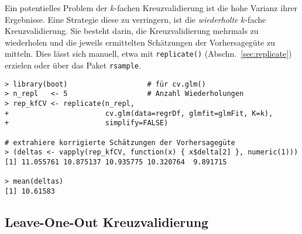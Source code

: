 Ein potentielles Problem der $k$-fachen Kreuzvalidierung ist die hohe Varianz ihrer Ergebnisse. Eine Strategie diese zu verringern, ist die \emph{wiederholte} $k$-fache Kreuzvalidierung. Sie besteht darin, die Kreuzvalidierung mehrmals zu wiederholen und die jeweils ermittelten Schätzungen der Vorhersagegüte zu mitteln. Dies lässt sich manuell, etwa mit \lstinline!replicate()! (Abschn.\ \ref{sec:replicate}) erzielen oder über das Paket  \lstinline!rsample!.
\begin{lstlisting}
> library(boot)                   # für cv.glm()
> n_repl   <- 5                   # Anzahl Wiederholungen
> rep_kfCV <- replicate(n_repl,
+                       cv.glm(data=regrDf, glmfit=glmFit, K=k),
+                       simplify=FALSE)

# extrahiere korrigierte Schätzungen der Vorhersagegüte
> (deltas <- vapply(rep_kfCV, function(x) { x$delta[2] }, numeric(1)))
[1] 11.055761 10.875137 10.935775 10.320764  9.891715

> mean(deltas)
[1] 10.61583
\end{lstlisting}

\subsection{Leave-One-Out Kreuzvalidierung}
\label{sec:LOOCV}

